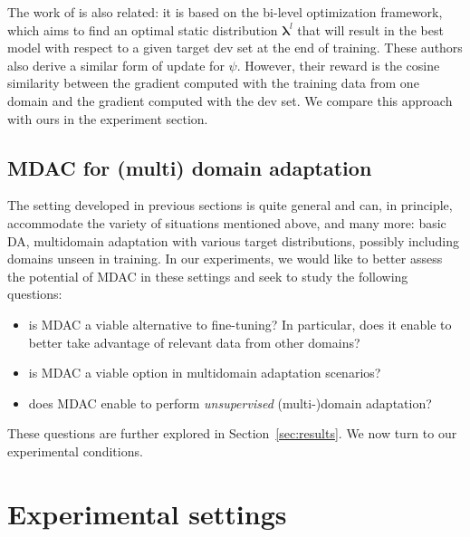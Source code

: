 \documentclass[11pt]{article}
\newcommand{\fyDone}[1]{\done[FY]\Todo[FY:]{\textcolor{orange}{#1}}}
\newcommand{\vlambda}{\ensuremath{\boldsymbol\lambda}\xspace} %
\begin{document}
The work of  is also related: it is based on the bi-level optimization framework, which aims to find an optimal static distribution $\vlambda^{l}$ that will result in the best model with respect to a given target dev set at the end of training. These authors also derive a similar form of update for $\psi$. However, their reward is the cosine similarity between the gradient computed with the training data from one domain and the gradient computed with the dev set. We compare this approach with ours in the experiment section.

\subsection{MDAC for (multi) domain adaptation}
The setting developed in previous sections is quite general and can, in principle, accommodate the variety of situations mentioned above, and many more: basic DA, multidomain adaptation with various target distributions, possibly including domains unseen in training. In our experiments, we would like to better assess the potential of MDAC in these settings and seek to study the following questions:
\begin{itemize}
\item is MDAC a viable alternative to fine-tuning? In particular, does it enable to better take advantage of relevant data from other domains?
\item is MDAC a viable option in multidomain adaptation scenarios?
\item does MDAC enable to perform \emph{unsupervised} (multi-)domain adaptation? \fyDone{TBContinued}
\end{itemize}
These questions are further explored in Section~\ref{sec:results}. We now turn to our experimental conditions.

\section{Experimental settings} \label{sec:exp}
\end{document}
